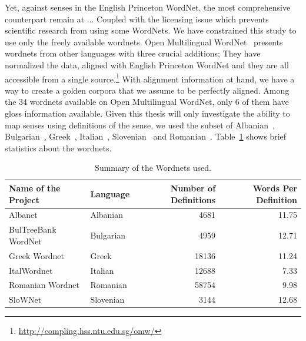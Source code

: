 Yet, against %
senses in the English Princeton WordNet, the most comprehensive counterpart remain at ... %
Coupled with the licensing issue which prevents scientific research from using some WordNets.
We have constrained this study to use only the freely available wordnets.
Open Multilingual WordNet~\cite{bond_survey_2012} presents wordnets from other languages with three crucial additions; %
They have normalized the data, aligned with English Princeton WordNet and they are all accessible from a single source.\footnote{\url{http://compling.hss.ntu.edu.sg/omw/}}
With alignment information at hand, we have a way to create a golden corpora that we assume to be perfectly aligned.
Among the 34 wordnets available on Open Multilingual WordNet, only 6 of them have gloss information available.
Given this thesis will only investigate the ability to map senses using definitions of the sense, we used the subset of Albanian~\cite{ruci_current_2008}, Bulgarian~\cite{simov_constructing_2010}, Greek~\cite{stamou_exploring_2004}, Italian~\cite{pianta_multiwordnet_2002}, Slovenian~\cite{fiser_slownet_2012} and Romanian~\cite{tufis_romanian_2008}.
Table~\ref{tab:summary_table} shows brief statistics about the wordnets.

\begin{table}[!hbp]
    \begin{center}
        \caption{Summary of the Wordnets used.}\label{tab:summary_table}
        \begin{tabular}{llrr}
            \toprule%
            \textbf{Name of the Project} & \textbf{Language} & \textbf{Number of Definitions} & \textbf{Words Per Definition} \\
            \midrule%
            Albanet & Albanian & 4681 & 11.75 \\
            BulTreeBank WordNet & Bulgarian & 4959 & 12.71 \\
            Greek Wordnet & Greek & 18136 & 11.24 \\
            ItalWordnet & Italian & 12688 & 7.33 \\
            Romanian Wordnet & Romanian & 58754 & 9.98 \\
            SloWNet & Slovenian & 3144 & 12.68 \\
            \bottomrule %
        \end{tabular}
    \end{center}
\end{table}

